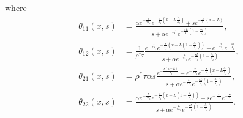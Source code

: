 \documentclass[preprint]{elsarticle}
\begin{document}
where
\begin{subequations}
\begin{align}
\theta_{11}\left(x,s\right) &=
\frac{
	\alpha 
		e^{
			-\frac{x}{\tau\lambda_{1}}
		}
		e^{
			-\frac{s}{\lambda_{1}}
				\left(
					x - L\frac{\lambda_{1}}{\lambda_{2}}
				\right)	
		}
	+
	s 
		e^{-\frac{s}{\lambda_{2}}\left(x - L\right)}
}{
	s
	+
	\alpha
	e^{-\frac{L}{\tau\lambda_{1}}}
	e^{
	-\frac{sL}{\lambda_{1}}
	\left(
		1 - \frac{\lambda_{1}}{\lambda_{2}}
	\right)
	}
}
,\\
\theta_{12}\left(x,s\right) &=
\frac{1}{\rho^{*}\tau}
\frac{
	e^{-\frac{L}{\tau\lambda_{1}}}
	e^{-\frac{s}{\lambda_{2}}
		\left(
			x - L
				\left(1 - 
					\frac{\lambda_{2}}{\lambda_{1}}
				\right)
		\right)
	}
	-
	e^{-\frac{x}{\tau\lambda_{1}}}
	e^{-\frac{sx}{\lambda_{1}}}
}
{
	s
	+
	\alpha
	e^{-\frac{L}{\tau\lambda_{1}}}
	e^{
	-\frac{sL}{\lambda_{1}}
	\left(
		1 - \frac{\lambda_{1}}{\lambda_{2}}
	\right)
	}
},\\
\theta_{21}\left(x,s\right) &=
\rho^{*}\tau\alpha s
\frac{
	e^{-\frac{s\left(x-L\right)}{\lambda_{2}}}
	-
	e^{-\frac{x}{\tau\lambda_{1}}}
	e^{-\frac{s}{\lambda_{1}}
		\left(
			x - L\frac{\lambda_{1}}{\lambda_{2}}
		\right)
	}
}{
	s
	+
	\alpha
	e^{-\frac{L}{\tau\lambda_{1}}}
	e^{
	-\frac{sL}{\lambda_{1}}
	\left(
		1 - \frac{\lambda_{1}}{\lambda_{2}}
	\right)
	}
},\\
\theta_{22}\left(x,s\right) &=
\frac{
	\alpha
	e^{-\frac{L}{\tau\lambda_{1}}}
	e^{-\frac{s}{\lambda_{2}}
		\left(
			x - L
				\left(
				1 - \frac{\lambda_{2}}{\lambda_{1}}
				\right)
		\right)
	}
	+
	s
	e^{-\frac{x}{\tau\lambda_{1}}}
	e^{-\frac{sx}{\lambda_{1}}}
}{
	s
	+
	\alpha
	e^{-\frac{L}{\tau\lambda_{1}}}
	e^{
	-\frac{sL}{\lambda_{1}}
	\left(
		1 - \frac{\lambda_{1}}{\lambda_{2}}
	\right)
	}
}
.
\end{align}
\end{subequations}
\end{document}
